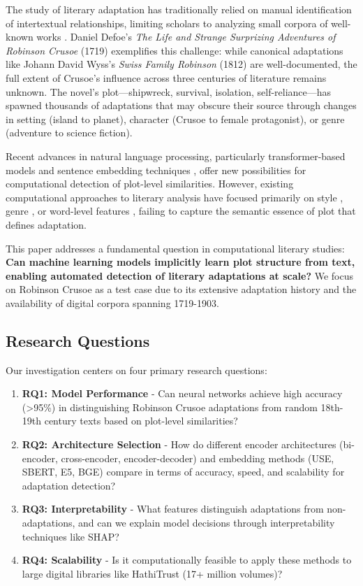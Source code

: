 \documentclass[12pt,a4paper]{article}
\begin{document}
The study of literary adaptation has traditionally relied on manual identification of intertextual relationships, limiting scholars to analyzing small corpora of well-known works \cite{Sanders2006}. Daniel Defoe's \textit{The Life and Strange Surprizing Adventures of Robinson Crusoe} (1719) exemplifies this challenge: while canonical adaptations like Johann David Wyss's \textit{Swiss Family Robinson} (1812) are well-documented, the full extent of Crusoe's influence across three centuries of literature remains unknown. The novel's plot—shipwreck, survival, isolation, self-reliance—has spawned thousands of adaptations that may obscure their source through changes in setting (island to planet), character (Crusoe to female protagonist), or genre (adventure to science fiction).

Recent advances in natural language processing, particularly transformer-based models \cite{Vaswani2017} and sentence embedding techniques \cite{Cer2018}, offer new possibilities for computational detection of plot-level similarities. However, existing computational approaches to literary analysis have focused primarily on style \cite{Shore2018}, genre \cite{Underwood2019}, or word-level features \cite{Moretti2013}, failing to capture the semantic essence of plot that defines adaptation.

This paper addresses a fundamental question in computational literary studies: \textbf{Can machine learning models implicitly learn plot structure from text, enabling automated detection of literary adaptations at scale?} We focus on Robinson Crusoe as a test case due to its extensive adaptation history and the availability of digital corpora spanning 1719-1903.

\subsection{Research Questions}

Our investigation centers on four primary research questions:

\begin{enumerate}
    \item \textbf{RQ1: Model Performance} - Can neural networks achieve high accuracy (>95\%) in distinguishing Robinson Crusoe adaptations from random 18th-19th century texts based on plot-level similarities?

    \item \textbf{RQ2: Architecture Selection} - How do different encoder architectures (bi-encoder, cross-encoder, encoder-decoder) and embedding methods (USE, SBERT, E5, BGE) compare in terms of accuracy, speed, and scalability for adaptation detection?

    \item \textbf{RQ3: Interpretability} - What features distinguish adaptations from non-adaptations, and can we explain model decisions through interpretability techniques like SHAP?

    \item \textbf{RQ4: Scalability} - Is it computationally feasible to apply these methods to large digital libraries like HathiTrust (17+ million volumes)?
\end{enumerate}
\end{document}
